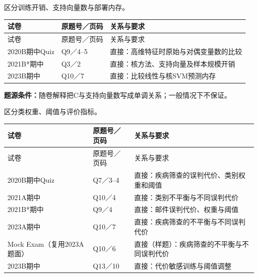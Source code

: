 
区分训练开销、支持向量数与部署内存。

\begingroup\small\setlength{\tabcolsep}{3pt}\renewcommand{\arraystretch}{1.22}
\begin{longtable}{@{}>{\raggedright\arraybackslash}p{}>{\raggedright\arraybackslash}p{}>{\raggedright\arraybackslash}p{}@{}}
\toprule
试卷 & 原题号／页码 & 关系与要求 \\
\midrule\endfirsthead
试卷 & 原题号／页码 & 关系与要求 \\
\midrule\endhead
\bottomrule\endfoot
2020B期中Quiz & Q9／4–5 & 直接：高维特征时原始与对偶变量数的比较 \\
2021B*期中 & Q3／2 & 直接：核方法、支持向量及样本规模开销 \\
2023B期中 & Q10／7 & 直接：比较线性与核SVM预测内存 \\
\end{longtable}\endgroup

\textbf{题源条件：}随卷解释把C与支持向量数写成单调关系；一般情况下不保证。



区分类权重、阈值与评价指标。

\begingroup\small\setlength{\tabcolsep}{3pt}\renewcommand{\arraystretch}{1.22}
\begin{longtable}{@{}>{\raggedright\arraybackslash}p{}>{\raggedright\arraybackslash}p{}>{\raggedright\arraybackslash}p{}@{}}
\toprule
试卷 & 原题号／页码 & 关系与要求 \\
\midrule\endfirsthead
试卷 & 原题号／页码 & 关系与要求 \\
\midrule\endhead
\bottomrule\endfoot
2020B期中Quiz & Q7／3–4 & 直接：疾病筛查的误判代价、类别权重和阈值 \\
2021A期中 & Q10／4 & 直接：类别不平衡与不同误判代价 \\
2021B*期中 & Q9／4 & 直接：邮件误判代价、权重与阈值 \\
2023A期中 & Q10／7 & 直接：疾病筛查的不平衡与不同误判代价 \\
Mock Exam（复用2023A题面） & Q10／6 & 直接（样题）：疾病筛查的不平衡与不同误判代价 \\
2023B期中 & Q13／10 & 直接：代价敏感训练与阈值调整 \\
\end{longtable}\endgroup

